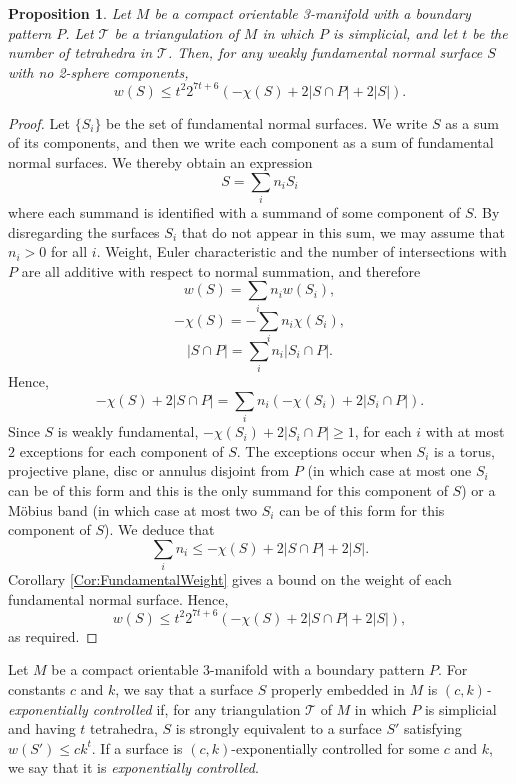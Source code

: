 \documentclass[oneside]{amsart}
\numberwithin{equation}{section}
\theoremstyle{plain}
\newtheorem{proposition}[equation]{Proposition}
\theoremstyle{definition}
\begin{document}
\begin{proposition}
\label{Prop:WeaklyFundamentalBound}
Let $M$ be a compact orientable 3-manifold with a boundary pattern $P$. Let $\mathcal{T}$ be a triangulation of $M$
in which $P$ is simplicial, and let $t$ be the number of tetrahedra in $\mathcal{T}$.
Then, for any weakly fundamental normal surface $S$ with no 2-sphere components, 
$$w(S) \leq t^2 2^{7t+6} (-\chi(S) + 2 |S \cap P| + 2|S|).$$
\end{proposition}

\begin{proof}
Let $\{ S_i \}$ be the set of fundamental normal surfaces. We write $S$ as a sum of its components,
and then we write each component as a sum of fundamental normal surfaces. We thereby obtain an expression
$$S = \sum_i n_i S_i$$
where each summand is identified with a summand of some component of $S$.
By disregarding the surfaces $S_i$ that do not appear in this sum, we may assume that $n_i > 0$ for all $i$.
Weight, Euler characteristic and the number of intersections with $P$ are all additive with respect to normal summation, and therefore
$$w(S) = \sum_i n_i w(S_i),$$
$$-\chi(S) = - \sum_i n_i \chi(S_i),$$
$$|S \cap P| =  \sum_i n_i |S_i \cap P|.$$
Hence,
$$-\chi(S) + 2|S \cap P| = \sum_i n_i (- \chi(S_i) + 2 |S_i \cap P|).$$
Since $S$ is weakly fundamental, $-\chi(S_i) + 2 |S_i \cap P| \geq 1$, for each $i$ with at most $2$ exceptions for each component of $S$.
The exceptions occur when $S_i$ is a torus, projective plane, disc or annulus disjoint from $P$ (in which case
at most one $S_i$ can be of this form and this is the only summand for this component of $S$) or a M\"obius band
(in which case at most two $S_i$ can be of this form for this component of $S$). We deduce that
$$\sum_i n_i \leq -\chi(S) + 2 |S \cap P| + 2|S|.$$
Corollary \ref{Cor:FundamentalWeight} gives a bound on the weight of each
fundamental normal surface. Hence,
$$w(S) \leq t^2 2^{7t+6}(-\chi(S) + 2 |S \cap P| + 2|S|),$$
as required. 
\end{proof}

Let $M$ be a compact orientable 3-manifold with a boundary pattern $P$. For constants $c$ and $k$, 
we say that a surface $S$ properly embedded
in $M$ is \emph{$(c,k)$-exponentially controlled} if, for any triangulation 
$\mathcal{T}$ of $M$ in which $P$ is simplicial and having $t$ tetrahedra, $S$ is strongly equivalent to a surface $S'$ satisfying $w(S') \leq ck^t$.
If a surface is $(c,k)$-exponentially controlled for some $c$ and $k$, we say that it is \emph{exponentially controlled}.
\end{document}
